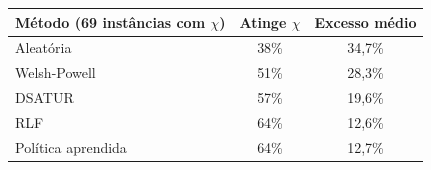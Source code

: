 \begin{tabular}{@{}lcc@{}}
\toprule
Método (69 instâncias com $\chi$) & Atinge $\chi$ & Excesso médio \\
\midrule
Aleatória & 38\% & 34{,}7\% \\
Welsh-Powell & 51\% & 28{,}3\% \\
DSATUR & 57\% & 19{,}6\% \\
RLF & 64\% & 12{,}6\% \\
Política aprendida & 64\% & 12{,}7\% \\
\bottomrule
\end{tabular}
